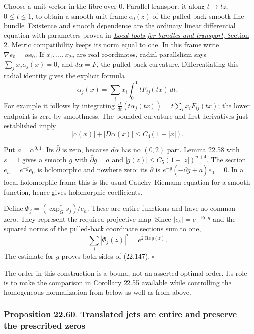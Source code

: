 \documentclass[
  11pt,
  a4paper,
]{article}
\begin{document}
Choose a unit vector in the fibre over \(0\). Parallel transport it
along \(t\mapsto tz\), \(0\le t\le1\), to obtain a smooth unit frame
\(e_0(z)\) of the pulled-back smooth line bundle. Existence and smooth
dependence are the ordinary linear differential equation with parameters
proved in
\href{https://kokunoyumeto.github.io/open-math-courses-public/courses/DG-FND/local-tools-for-bundles-and-transport.html\#2-differential-equations-and-their-parameters}{\emph{Local
tools for bundles and transport}, Section 2}. Metric compatibility keeps
its norm equal to one. In this frame write \(\nabla e_0=\alpha e_0\). If
\(x_1,\ldots,x_{2n}\) are real coordinates, radial parallelism says
\(\sum_jx_j\alpha_j(x)=0\), and \(d\alpha=F\), the pulled-back
curvature. Differentiating this radial identity gives the explicit
formula \[
 \alpha_j(x)=\sum_i x_i\int_0^1 t F_{ij}(tx)\,dt.
 \tag{22.148}
\] For example it follows by integrating
\(\frac{d}{dt}(t\alpha_j(tx))=t\sum_i x_iF_{ij}(tx)\); the lower
endpoint is zero by smoothness. The bounded curvature and first
derivatives just established imply \[
 |\alpha(x)|+|D\alpha(x)|\le C_4(1+|x|).
 \tag{22.149}
\]

Put \(a=\alpha^{0,1}\). Its \(\bar\partial\) is zero, because
\(d\alpha\) has no \((0,2)\) part. Lemma 22.58 with \(s=1\) gives a
smooth \(g\) with \(\bar\partial g=a\) and
\(|g(z)|\le C_5(1+|z|)^{n+4}\). The section \(e_h=e^{-g}e_0\) is
holomorphic and nowhere zero: its \(\bar\partial\) is
\(e^{-g}(-\bar\partial g+a)e_0=0\). In a local holomorphic frame this is
the usual Cauchy--Riemann equation for a smooth function, hence gives
holomorphic coefficients.

Define \(\Phi_j=(\exp_G^*s_j)/e_h\). These are entire functions and have
no common zero. They represent the required projective map. Since
\(|e_h|=e^{-\operatorname{Re}g}\) and the squared norms of the
pulled-back coordinate sections sum to one, \[
 \sum_j|\Phi_j(z)|^2=e^{2\operatorname{Re}g(z)}.
 \tag{22.150}
\] The estimate for \(g\) proves both sides of (22.147). \(\square\)

The order in this construction is a bound, not an asserted optimal
order. Its role is to make the comparison in Corollary 22.55 available
while controlling the homogeneous normalization from below as well as
from above.

\subsubsection{Proposition 22.60. Translated jets are entire and
preserve the prescribed
zeros}\label{proposition-22.60.-translated-jets-are-entire-and-preserve-the-prescribed-zeros}
\end{document}

